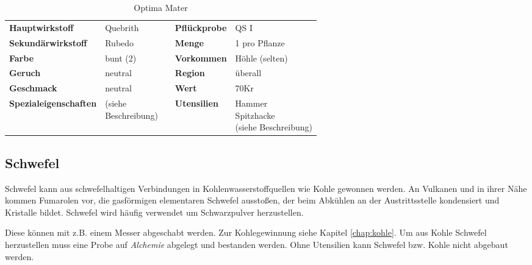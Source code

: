 \begin{table}[h] 
\begin{center} 
\begin{tabular}{|l|l|p{1cm}|l|l|} 
  	\cline{1-2} \cline{4-5} 
  	\textbf{Hauptwirkstoff} & Quebrith && \textbf{Pflückprobe} & QS I \\ \cline{1-2} \cline{4-5} 
  	\textbf{Sekundärwirkstoff} & Rubedo && \textbf{Menge} & 1 pro Pflanze \\ \cline{1-2} \cline{4-5} 
  	\textbf{Farbe} & bunt (2) && \textbf{Vorkommen} & Höhle (selten) \\ \cline{1-2} \cline{4-5} 
  	\textbf{Geruch} & neutral && \textbf{Region} & überall \\ \cline{1-2} \cline{4-5} 
  	\textbf{Geschmack} & neutral && \textbf{Wert} & 70Kr \\ \cline{1-2} \cline{4-5} 
  	\textbf{Spezialeigenschaften} & \brcell{(siehe \\ Beschreibung)} && \textbf{Utensilien} & \brcell{Hammer \\ Spitzhacke \\ (siehe Beschreibung)} \\ \cline{1-2} \cline{4-5} 
\end{tabular} 
\end{center} 
\caption{Optima Mater} 
\label{tab:optima_mater} 
\end{table}


\subsection{Schwefel}
Schwefel kann aus schwefelhaltigen Verbindungen in Kohlenwasserstoffquellen wie Kohle gewonnen werden. An Vulkanen und in ihrer Nähe kommen Fumarolen vor, die gasförmigen elementaren Schwefel ausstoßen, der beim Abkühlen an der Austrittsstelle kondensiert und Kristalle bildet. Schwefel wird häufig verwendet um Schwarzpulver herzustellen.

Diese können mit z.B. einem Messer abgeschabt werden. Zur Kohlegewinnung siehe Kapitel \ref{chap:kohle}. Um aus Kohle Schwefel herzustellen muss eine Probe auf \textit{Alchemie} abgelegt und bestanden werden. Ohne Utensilien kann Schwefel bzw. Kohle nicht abgebaut werden.

